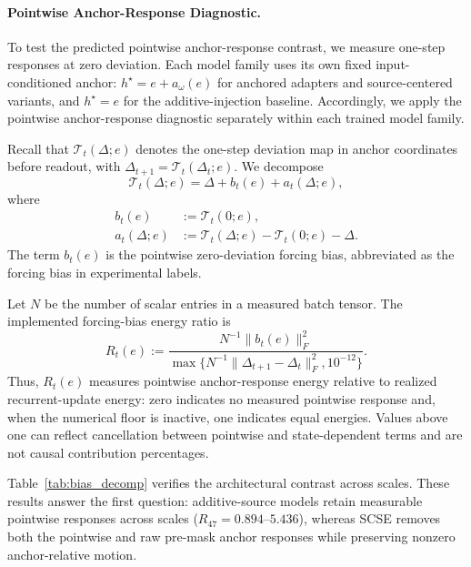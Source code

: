 \documentclass[letterpaper]{article} %
\newcommand{\SCSE}{\textsc{SCSE}}
\newcommand{\norm}[1]{\lVert#1\rVert}
\newcommand{\Tmap}{\mathcal{T}}
\theoremstyle{remark}
\begin{document}
\paragraph{Pointwise Anchor-Response Diagnostic.} To test the predicted pointwise anchor-response contrast, we measure one-step responses at zero deviation.  Each model family uses its own fixed input-conditioned anchor: $h^\star=e+a_\omega(e)$ for anchored adapters and source-centered variants, and $h^\star=e$ for the additive-injection baseline.  Accordingly, we apply the pointwise anchor-response diagnostic separately within each trained model family.

Recall that $\Tmap_t(\Delta;e)$ denotes the one-step deviation map in anchor coordinates before readout, with $\Delta_{t+1}=\Tmap_t(\Delta_t;e)$.  We decompose
\begin{equation}
	\Tmap_t(\Delta;e)=\Delta+b_t(e)+a_t(\Delta;e),
	\label{eq:forcing-decomposition}
\end{equation}
where
\begin{equation}
	\begin{aligned}
		b_t(e)        & :=\Tmap_t(0;e),                          \\
		a_t(\Delta;e) & :=\Tmap_t(\Delta;e)-\Tmap_t(0;e)-\Delta.
	\end{aligned}
\end{equation}
The term $b_t(e)$ is the pointwise zero-deviation forcing bias, abbreviated as the forcing bias in experimental labels.


Let $N$ be the number of scalar entries in a measured batch tensor.  The implemented forcing-bias energy ratio is
\begin{equation}
	R_t(e)
	:=
	\frac{N^{-1}\norm{b_t(e)}_F^2}
	{\max\{N^{-1}\norm{\Delta_{t+1}-\Delta_t}_F^2,10^{-12}\}}.
	\label{eq:forcing-bias-ratio}
\end{equation}
Thus, $R_t(e)$ measures pointwise anchor-response energy relative to realized recurrent-update energy: zero indicates no measured pointwise response and, when the numerical floor is inactive, one indicates equal energies.  Values above one can reflect cancellation between pointwise and state-dependent terms and are not causal contribution percentages.

Table~\ref{tab:bias_decomp} verifies the architectural contrast across scales.  These results answer the first question: additive-source models retain measurable pointwise responses across scales ($R_{47}=0.894$--$5.436$), whereas \SCSE{} removes both the pointwise and raw pre-mask anchor responses while preserving nonzero anchor-relative motion.
\end{document}
